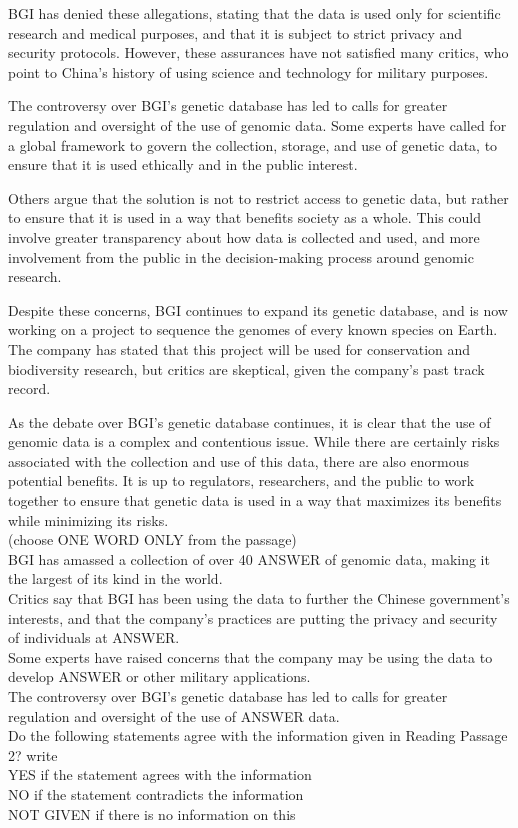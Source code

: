 \documentclass[10pt, a4paper, oneside]{article}
\begin{document}
\begin{spacing}{2.0}
BGI has denied these allegations, stating that the data is used only for scientific research and medical purposes, 
and that it is subject to strict privacy and security protocols. However, these assurances have not satisfied many critics, 
who point to China's history of using science and technology for military purposes.

The controversy over BGI's genetic database has led to calls for greater regulation and oversight of the use of genomic data. 
Some experts have called for a global framework to govern the collection, storage, and use of genetic data, to ensure that it is 
used ethically and in the public interest.

Others argue that the solution is not to restrict access to genetic data, but rather to ensure that it is used in a way that 
benefits society as a whole. This could involve greater transparency about how data is collected and used, and more involvement 
from the public in the decision-making process around genomic research.

Despite these concerns, BGI continues to expand its genetic database, and is now working on a project to sequence the genomes of every 
known species on Earth. The company has stated that this project will be used for conservation and biodiversity research, but critics 
are skeptical, given the company's past track record.

As the debate over BGI's genetic database continues, it is clear that the use of genomic data is a complex and contentious issue. 
While there are certainly risks associated with the collection and use of this data, there are also enormous potential benefits. 
It is up to regulators, researchers, and the public to work together to ensure that genetic data is used in a way that maximizes 
its benefits while minimizing its risks.\\

(choose ONE WORD ONLY from the passage)\\

BGI has amassed a collection of over 40 ANSWER of genomic data, making it the largest of its kind in the world.\\
Critics say that BGI has been using the data to further the Chinese government's interests, and that the company's practices are putting the privacy and security of individuals at ANSWER.\\
Some experts have raised concerns that the company may be using the data to develop ANSWER or other military applications.\\
The controversy over BGI's genetic database has led to calls for greater regulation and oversight of the use of ANSWER data.\\
Do the following statements agree with the information given in Reading Passage 2?
write\\
YES if the statement agrees with the information\\
NO if the statement contradicts the information\\
NOT GIVEN if there is no information on this\\


\end{spacing}
\end{document}
